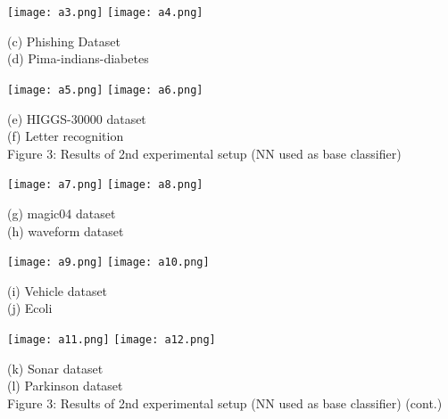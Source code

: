 \documentclass{article}
\begin{document}
		  \vspace{0.9em}
		  \texttt{[image: a3.png]}
		  \texttt{[image: a4.png]}
		  \begin{center}
		  	\small (c) Phishing Dataset\\
		  	\vspace{0.5em}(d) Pima-indians-diabetes
		  \end{center}
		  
		  \vspace{0.9em}
		  \texttt{[image: a5.png]}
		  \texttt{[image: a6.png]}
		  \begin{center}
		  	\small (e) HIGGS-30000 dataset\\
		  	\vspace{0.5em}(f) Letter recognition\\
		  	\vspace{0.9em}
		  	Figure 3: Results of 2nd experimental setup (NN used as base classifier)
		  \end{center}
		  
		  
		  
		   \newpage
		  \texttt{[image: a7.png]}
		  \texttt{[image: a8.png]}
		  \begin{center}
		  	\small (g) magic04 dataset \\
		  	\vspace{0.5em}(h) waveform dataset
		  \end{center}
		  
		  \vspace{0.9em}
		  \texttt{[image: a9.png]}
		  \texttt{[image: a10.png]}
		  \begin{center}
		  	\small (i) Vehicle dataset \\
		  	\vspace{0.5em}(j) Ecoli
		  \end{center}
		  
		  \vspace{0.9em}
		  \texttt{[image: a11.png]}
		  \texttt{[image: a12.png]}
		  \begin{center}
		  	\small (k) Sonar dataset\\
		  	\vspace{0.5em}(l) Parkinson dataset \\
		  	\vspace{0.9em}
		  	Figure 3: Results of 2nd experimental setup (NN used as base classifier) (cont.)
		  \end{center}
		  
\end{document}
